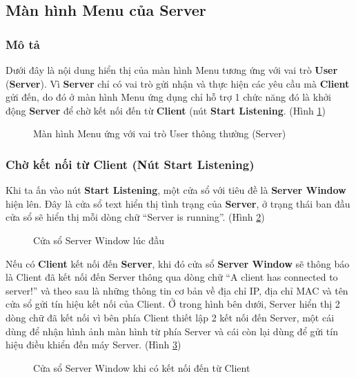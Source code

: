 \subsection{Màn hình Menu của Server}
\subsubsection{Mô tả}
Dưới đây là nội dung hiển thị của màn hình Menu tương ứng với vai trò \textbf{User} (\textbf{Server}). Vì \textbf{Server} chỉ có vai trò gửi nhận và thực hiện các yêu cầu mà \textbf{Client} gửi đến, do đó ở màn hình Menu ứng dụng chỉ hỗ trợ 1 chức năng đó là khởi động \textbf{Server} để chờ kết nối đến từ \textbf{Client} (nút \textbf{Start Listening}. (Hình \ref{fig:ServerMenuWindow})
\begin{figure}[H]
	\caption{Màn hình Menu ứng với vai trò User thông thường (Server)}
	\label{fig:ServerMenuWindow}
\end{figure}

\subsubsection{Chờ kết nối từ Client (Nút Start Listening)}
Khi ta ấn vào nút \textbf{Start Listening}, một cửa sổ với tiêu đề là \textbf{Server Window} hiện lên. Đây là cửa sổ text hiển thị tình trạng của \textbf{Server}, ở trạng thái ban đầu cửa sổ sẽ hiển thị mỗi dòng chữ ``Server is running''. (Hình \ref{fig:ServerLoggerWindow})
\begin{figure}[H]
	\caption{Cửa sổ Server Window lúc đầu}
	\label{fig:ServerLoggerWindow}
\end{figure}

Nếu có \textbf{Client} kết nối đến \textbf{Server}, khi đó cửa sổ \textbf{Server Window} sẽ thông báo là Client đã kết nối đến Server thông qua dòng chữ ``A client has connected to server!'' và theo sau là những thông tin cơ bản về địa chỉ IP, địa chỉ MAC và tên cửa sổ gửi tín hiệu kết nối của Client. Ở trong hình bên dưới, Server hiển thị 2 dòng chữ đã kết nối vì bên phía Client thiết lập 2 kết nối đến Server, một cái dùng để nhận hình ảnh màn hình từ phía Server và cái còn lại dùng để gửi tín hiệu điều khiển đến máy Server. (Hình \ref{fig:ServerWindowConnected})
\begin{figure}[H]
	\caption{Cửa sổ Server Window khi có kết nối đến từ Client}
	\label{fig:ServerWindowConnected}
\end{figure}

